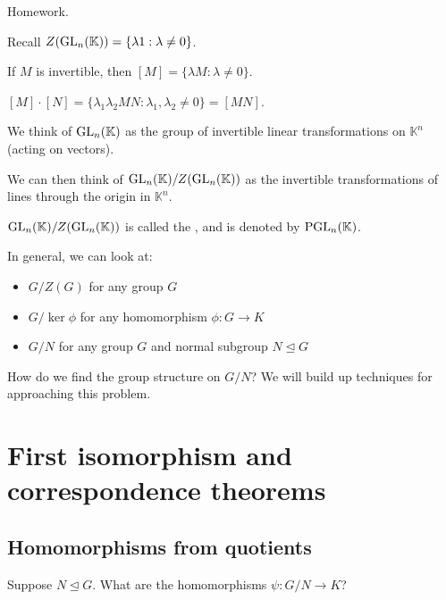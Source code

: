 \documentclass[12pt,letterpaper]{report}
\begin{document}
\begin{ex}[Example: $D_{2n}/Z(D_{2n})$]
  Homework.
\end{ex}

\begin{ex}
  Recall $Z(\operatorname{GL}_n(\mathbb{K})) = \{\lambda 1 : \lambda \neq 0\}$.

  If $M$ is invertible, then $[M] = \{\lambda M : \lambda \neq 0\}$.

  $[M] \cdot [N] = \{\lambda_1 \lambda_2 MN : \lambda_1, \lambda_2 \neq 0\} = [MN]$.

  We think of $\operatorname{GL}_n(\mathbb{K})$ as the group of invertible linear transformations on
  $\mathbb{K}^n$ (acting on vectors).

  We can then think of $\operatorname{GL}_n(\mathbb{K})/Z(\operatorname{GL}_n(\mathbb{K}))$ as the invertible transformations of
  lines through the origin in $\mathbb{K}^n$.

  $\operatorname{GL}_n(\mathbb{K})/Z(\operatorname{GL}_n(\mathbb{K}))$ is called the ,
  and is denoted by $\operatorname{PGL}_n(\mathbb{K})$.
\end{ex}

In general, we can look at:
\begin{itemize}
  \item $G / Z(G)$ for any group $G$
  \item $G / \ker\phi$ for any homomorphism $\phi \colon G \to K$
  \item $G / N$ for any group $G$ and normal subgroup $N \trianglelefteq G$
\end{itemize}
How do we find the group structure on $G/N$?
We will build up techniques for approaching this problem.

\section{First isomorphism and correspondence theorems}

\subsection{Homomorphisms from quotients}

Suppose $N \trianglelefteq G$.
What are the homomorphisms $\psi \colon G/N \to K$?

\begin{center}
\end{center}
\end{document}
